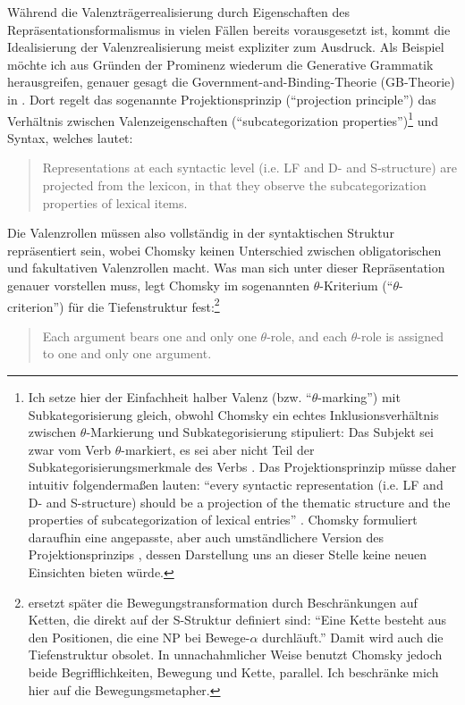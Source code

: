 Während die Valenzträgerrealisierung durch Eigenschaften des Repräsentationsformalismus in vielen Fällen bereits vorausgesetzt ist, kommt die Idealisierung der Valenzrealisierung meist expliziter zum Ausdruck. Als Beispiel möchte ich aus Gründen der Prominenz wiederum die Generative Grammatik herausgreifen, genauer gesagt die Government-and-Binding-Theorie (GB-Theorie) in \cite{Chomsky:81}. Dort regelt das sogenannte Projektionsprinzip ("`projection principle"') das Verhältnis zwischen Valenzeigenschaften ("`subcategorization properties"')\footnote{\label{fn-subkat-valenz}Ich setze hier der Einfachheit halber Valenz (bzw. "`$\theta$-marking"') mit Subkategorisierung gleich, obwohl Chomsky ein echtes Inklusionsverhältnis zwischen $\theta$-Markierung und Subkategorisierung stipuliert: Das Subjekt sei zwar vom Verb $\theta$-markiert, es sei aber nicht Teil der Subkategorisierungsmerkmale des Verbs \citep[37]{Chomsky:81}. Das Projektionsprinzip müsse daher intuitiv folgenderma\ss en lauten: "`every syntactic representation (i.e. LF and D- and S-structure) should be a projection of the thematic structure and the properties of subcategorization of lexical entries"' \citep[36]{Chomsky:81}. Chomsky formuliert daraufhin eine angepasste, aber auch umständlichere Version des Projektionsprinzips \citep[38]{Chomsky:81}, dessen Darstellung uns an dieser Stelle keine neuen Einsichten bieten würde.} und Syntax, welches lautet:  
\begin{quote}
Representations at each syntactic level (i.e. LF and D- and S-structure) are projected from the lexicon, in that they observe the subcategorization properties of lexical items. \citep[29]{Chomsky:81}
\end{quote}
Die Valenzrollen müssen also vollständig in der syntaktischen Struktur repräsentiert sein, wobei Chomsky keinen Unterschied zwischen obligatorischen und fakultativen Valenzrollen macht. Was man sich unter dieser Repräsentation genauer vorstellen muss, legt Chomsky im sogenannten $\theta$-Kriterium ("`$\theta$-criterion"') für die Tiefenstruktur fest:\footnote{\cite{Chomsky:81} ersetzt später die Bewegungstransformation durch Beschränkungen auf Ketten, die direkt auf der S-Struktur definiert sind: "`Eine Kette besteht aus den Positionen, die eine NP bei Bewege-$\alpha$ durchläuft."' \cite[263]{Stechow:Sternefeld:88} Damit wird auch die Tiefenstruktur obsolet. In unnachahmlicher Weise benutzt Chomsky jedoch beide Begrifflichkeiten, Bewegung und Kette, parallel. Ich beschränke mich hier auf die Bewegungsmetapher.}  
\begin{quote}
Each argument bears one and only one $\theta$-role, and each $\theta$-role is assigned to one and only one argument. \citep[36]{Chomsky:81}
\end{quote} 
